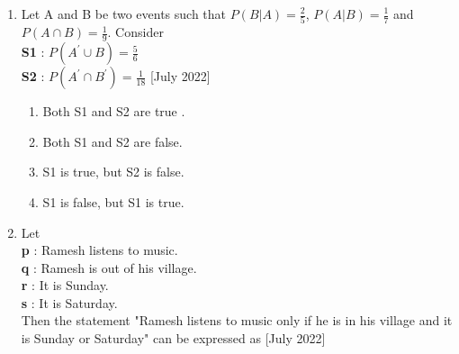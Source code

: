 \documentclass[journal,12pt,onecolumn]{IEEEtran}
\theoremstyle{remark}
\begin{document}
\begin{enumerate}
		\begin{enumerate}
		\end{enumerate}
	\item Let A and B be two events such that $P(B|A) = \frac{2}{5}$, $P(A|B) = \frac{1}{7}$ and $P(A \cap B) = \frac{1}{9}$. Consider \\
		\textbf{S1} : $P(A^{\prime} \cup B) = \frac{5}{6} $ \\
		\textbf{S2} : $P(A^{\prime} \cap B^{\prime}) = \frac{1}{18} $    \hfill{[July 2022]}
		\begin{enumerate}
			\item Both S1 and S2 are true .
			\item Both S1 and S2 are false.
			\item S1 is true, but S2 is false.
			\item S1 is false, but S1 is true.
		\end{enumerate}
	\item Let \\
		\textbf{p} : Ramesh listens to music. \\
		\textbf{q} : Ramesh is out of his village. \\
		\textbf{r} : It is Sunday. \\
		\textbf{s} : It is Saturday. \\
		Then the statement "Ramesh listens to music only if he is in his village and it is Sunday or Saturday" can be expressed as \hfill{[July 2022]}
		\begin{enumerate}
		\end{enumerate}
\end{enumerate}
\end{document}
